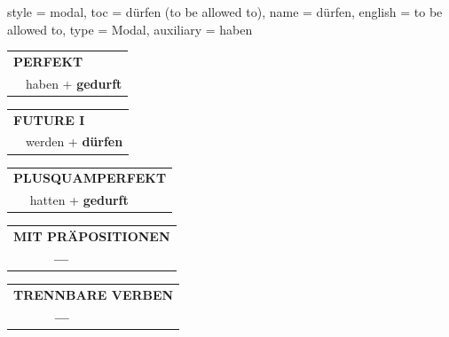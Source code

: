 \begin{verbentry}{
  style = {modal},
  toc = {dürfen (to be allowed to)},
  name = {dürfen},
  english = {to be allowed to},
  type = {Modal},
  auxiliary = {haben}
}
    \vspace{10pt}
 
    \begin{tabular}{rl}
     \multicolumn{2}{l}{\textbf{PERFEKT}}\\
   & haben + \textbf{gedurft}\\
  \end{tabular}
\hfill
   \begin{tabular}{rl}
   
    \multicolumn{2}{l}{\textbf{FUTURE I} }\\
    &werden + \textbf{dürfen}\\
 
  \end{tabular}
\hfill
   \begin{tabular}{rl}
      \multicolumn{2}{l}{\textbf{PLUSQUAMPERFEKT}}\\
   & hatten + \textbf{gedurft}\\
  \end{tabular}
  
  
\vspace{10pt}

\begin{tabular}{lll}
\multicolumn{3}{l}{\textbf{MIT PRÄPOSITIONEN}}\\
& \textbf{---} & \\
\end{tabular}
\hfill
\begin{tabular}{lll}
\multicolumn{3}{l}{\textbf{TRENNBARE VERBEN}}\\
& \textbf{---} & \\
\end{tabular}
\vspace{-5pt}
\end{verbentry}

